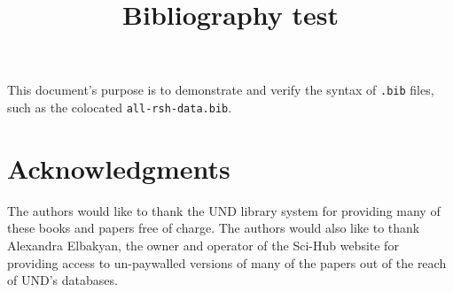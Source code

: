 \documentclass{IEEEtran}
\title{Bibliography test}
\begin{document}
\maketitle
This document's purpose is to demonstrate and verify the syntax of \verb|.bib| files,
such as the colocated \verb|all-rsh-data.bib|.

\section{Acknowledgments}

The authors would like to thank the UND library system for providing many of these books and
papers free of charge.  The authors would also like to thank Alexandra Elbakyan, the owner
and operator of the Sci-Hub website for providing access to un-paywalled versions of many
of the papers out of the reach of UND's databases.


\nocite{*}

\end{document}

